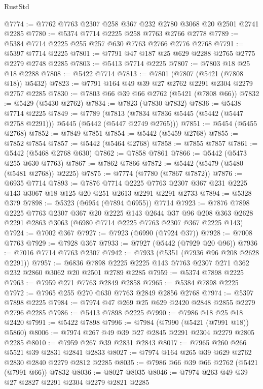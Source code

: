 \begin{lexlean}{RustStd}
\begin{coremodule}
{\begin{coremodule}
{{{{{{{{{{{{@7774 := @7762 @7763 @2307 @258 @367 @232 @2780 @3068 @20 @2501 @2741 @2285
@7780 := @5374 @7714 @2225 @258 @7763 @2766 @2778
@7789 := @5384 @7714 @2225 @255 @257 @630 @7763 @2766 @2776 @2768
@7791 := @5397 @7714 @2225
@7801 := @7791 @47 @187 @25 @629 @2288 @2765 @2775 @2279 @2748 @2285
@7803 := @5413 @7714 @2225
@7807 := @7803 @18 @25 @18 @2288
@7808 := @5422 @7714
@7813 := @7801 (@7807 (@5421 (@7808 @18)) @5432)
@7823 := @7791 @164 @49 @39 @27 @2762 @2291 @2304 @2279 @2757 @2285
@7830 := @7803 @66 @39 @66 @2762 (@5421 (@7808 @66))
@7832 := @5429 (@5430 @2762)
@7834 := @7823 (@7830 @7832)
@7836 := @5438 @7714 @2225
@7849 := @7789
    (@7813 (@7834 @7836 @5445 (@5442 (@5447 @2758 @2291))) @5445 (@5442 (@5447 @2749 @2765)))
@7851 := @5454 (@5455 @2768)
@7852 := @7849 @7851
@7854 := @5442 (@5459 @2768)
@7855 := @7852 @7854
@7857 := @5442 (@5464 @2768)
@7858 := @7855 @7857
@7861 := @5442 (@5468 @2768 @630)
@7862 := @7858 @7861
@7866 := @5442 (@5473 @255 @630 @7763)
@7867 := @7862 @7866
@7872 := @5442 (@5479 (@5480 (@5481 @2768)) @2225)
@7875 := @7774 (@7780 (@7867 @7872))
@7876 := @6935 @7714
@7893 := @7876
    @7714
    @2225
    @7763
    @2307
    @367
    @231
    @2225
    @143
    @3067
    @18
    @125
    @20
    @251
    @2613
    @2291
    @2291
    @2733
@7894 := @5328 @379
@7898 := @5323 (@6954 (@7894 @6955)) @7714
@7923 := @7876
    @7898
    @2225
    @7763
    @2307
    @367
    @20
    @2225
    @143
    @2644
    @37
    @96
    @208
    @363
    @2628
    @2291
    @2863
    @3063
    (@6980 @7714 @2225 @7763 @2307 @367 @2225 @143)
@7924 := @7002 @367
@7927 := @7923 (@6990 (@7924 @37))
@7928 := @7008 @7763
@7929 := @7928 @367
@7933 := @7927 (@5442 (@7929 @20 @96))
@7936 := @7016 @7714 @7763 @2307
@7942 := @7933 (@5351 (@7936 @96 @208 @2628 @2291))
@7957 := @6836 @7898 @2225 @2225 @143 @7763 @2307 @271 @362 @232 @2860 @3062 @20 @2501 @2789 @2285
@7959 := @5374 @7898 @2225
@7963 := @7959 @271 @7763 @2849 @2858
@7965 := @5384 @7898 @2225
@7972 := @7965 @255 @270 @630 @7763 @2849 @2856 @2768
@7974 := @5397 @7898 @2225
@7984 := @7974 @47 @269 @25 @629 @2420 @2848 @2855 @2279 @2796 @2285
@7986 := @5413 @7898 @2225
@7990 := @7986 @18 @25 @18 @2420
@7991 := @5422 @7898
@7996 := @7984 (@7990 (@5421 (@7991 @18)) @5860)
@8006 := @7974 @267 @49 @39 @27 @2845 @2291 @2304 @2279 @2805 @2285
@8010 := @7959 @267 @39 @2831 @2843
@8017 := @7965 @260 @266 @5521 @39 @2831 @2841 @2833
@8027 := @7974 @164 @265 @39 @629 @2762 @2830 @2840 @2279 @2812 @2285
@8035 := @7986 @66 @39 @66 @2762 (@5421 (@7991 @66)) @7832
@8036 := @8027 @8035
@8046 := @7974 @263 @49 @39 @27 @2827 @2291 @2304 @2279 @2821 @2285
}}}}}}}}}}}}
\end{coremodule}}
\end{coremodule}
\end{lexlean}
